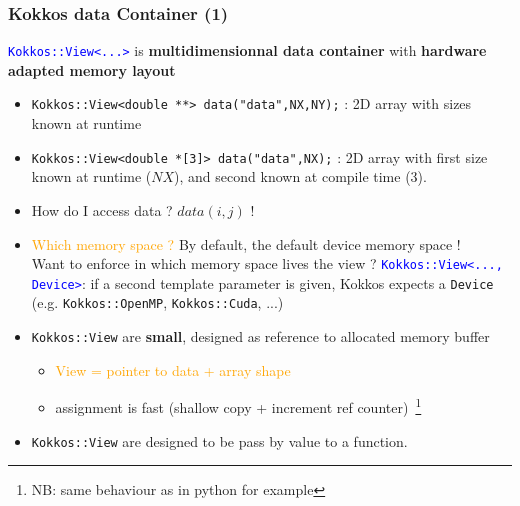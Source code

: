 \begin{frame}[fragile=singleslide]
  \frametitle{Kokkos data Container (1)}
  
  {\large \textcolor{blue}{\texttt{Kokkos::View<...>}} is \textbf{multidimensionnal data container} with \textbf{hardware adapted memory layout}}
  \begin{itemize}
  \item \texttt{Kokkos::View<double **> data("data",NX,NY);} : 2D array with sizes known at runtime
  \item \texttt{Kokkos::View<double *[3]> data("data",NX);} : 2D array with first size known at runtime ($NX$), and second known at compile time (3).
  \item How do I access data ? $data(i,j)$ !
  \item \textcolor{orange}{Which memory space ?} By default, the default device memory space !\\
    Want to enforce in which memory space lives the view ? 
    \textcolor{blue}{\texttt{Kokkos::View<..., Device>}}: if a second template parameter is given, Kokkos expects a \texttt{Device} (e.g. \texttt{Kokkos::OpenMP}, \texttt{Kokkos::Cuda}, ...)
  \item \texttt{Kokkos::View} are \textbf{small}, designed as reference to allocated memory buffer
    \begin{itemize}
    \item \textcolor{orange}{View = pointer to data + array shape}
    \item assignment is fast (shallow copy + increment ref counter)~\footnote{NB: same behaviour as in python for example}
    \end{itemize}
  \item \texttt{Kokkos::View} are designed to be pass by value to a function.
  \end{itemize}

\end{frame}

